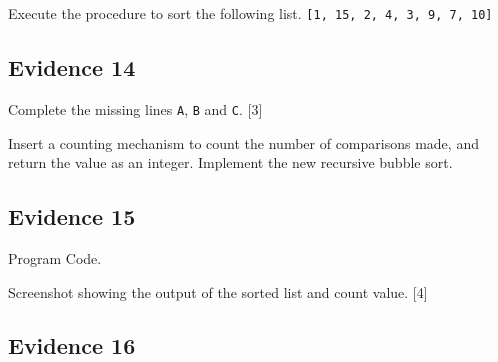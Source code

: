 \noindent{}

Execute the procedure to sort the following list. \texttt{{[}1, 15,
2, 4, 3, 9, 7, 10{]} }

\subsection*{Evidence 14}

Complete the missing lines \texttt{A}, \texttt{B} and \texttt{C}.
\hfill{}{[}3{]}

Insert a counting mechanism to count the number of comparisons made,
and return the value as an integer. Implement the new recursive bubble
sort. 

\subsection*{Evidence 15}

Program Code. 

Screenshot showing the output of the sorted list and count value.
\hfill{}{[}4{]}

\subsection*{Evidence 16 }

